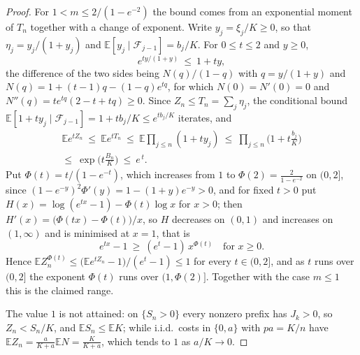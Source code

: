 \documentclass[12pt,oneside,reqno,fleqn]{amsart}
\numberwithin{equation}{section}
\theoremstyle{remark}
\newcommand\cff{{\mathcal F}}
\newcommand\mE{{\mathbb E}}
\newcommand\E{\mE}
\newcommand{\1}{{\mathbf 1}}
\renewcommand{\le}{\leq}
\renewcommand{\ge}{\geq}
\begin{document}
\begin{proof}
		For $1<m\le2/(1-e^{-2})$ the bound comes from an exponential moment of $T_n$ together with a change of exponent. Write $y_j=\xi_j/K\ge0$, so that $\eta_j=y_j/(1+y_j)$ and $\E[y_j\mid\cff_{j-1}]=b_j/K$. For $0\le t\le2$ and $y\ge0$,
		\[
			e^{t y/(1+y)}\ \le\ 1+ty,
		\]
		the difference of the two sides being $N(q)/(1-q)$ with $q=y/(1+y)$ and $N(q)=1+(t-1)q-(1-q)e^{tq}$, for which $N(0)=N'(0)=0$ and $N''(q)=te^{tq}(2-t+tq)\ge0$. Since $Z_n\le T_n=\sum_j\eta_j$, the conditional bound $\E[1+ty_j\mid\cff_{j-1}]=1+tb_j/K\le e^{tb_j/K}$ iterates, and
		\begin{gather*}
			\E e^{tZ_n}\ \le\ \E e^{tT_n}\ \le\ \E\prod_{j\le n}(1+ty_j)\ \le\ \prod_{j\le n}\Big(1+t\frac{b_j}{K}\Big)\\
			\le\ \exp\Big(t\frac{B_n}{K}\Big)\ \le\ e^{\,t}.
		\end{gather*}
		Put $\Phi(t)=t/(1-e^{-t})$, which increases from $1$ to $\Phi(2)=\frac2{1-e^{-2}}$ on $(0,2]$, since $(1-e^{-y})^2\Phi'(y)=1-(1+y)e^{-y}>0$, and for fixed $t>0$ put $H(x)=\log(e^{tx}-1)-\Phi(t)\log x$ for $x>0$; then $H'(x)=\big(\Phi(tx)-\Phi(t)\big)/x$, so $H$ decreases on $(0,1)$ and increases on $(1,\infty)$ and is minimised at $x=1$, that is
		\[
			e^{tx}-1\ \ge\ (e^t-1)\,x^{\Phi(t)}\quad\text{for }x\ge0 .
		\]
		Hence $\E Z_n^{\Phi(t)}\le\big(\E e^{tZ_n}-1\big)/(e^t-1)\le1$ for every $t\in(0,2]$, and as $t$ runs over $(0,2]$ the exponent $\Phi(t)$ runs over $(1,\Phi(2)]$. Together with the case $m\le1$ this is the claimed range.

		The value $1$ is not attained: on $\{S_n>0\}$ every nonzero prefix has $J_k>0$, so $Z_n<S_n/K$, and $\E S_n\le\E K$; while i.i.d.\ costs in $\{0,a\}$ with $pa=K/n$ have $\E Z_n=\frac{a}{K+a}\E N=\frac K{K+a}$, which tends to $1$ as $a/K\to0$.
	\end{proof}
\end{document}
